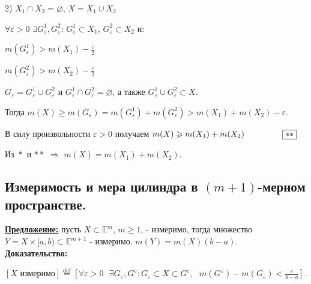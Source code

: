 \documentclass[a4paper,12pt]{article} %
\begin{document}
\vspace{5mm}
2) $X_1 \cap X_2 = \varnothing$, $X = X_1 \cup X_2$

$\forall \varepsilon > 0$ $\exists G_{\varepsilon}^1, G_{\varepsilon}^2$: $G_{\varepsilon}^1 \subset X_1$, $G_{\varepsilon}^2 \subset X_2$ и:

$m(G_{\varepsilon}^1) > m(X_1) - \frac{\varepsilon}{2}$

$m(G_{\varepsilon}^2) > m(X_2) - \frac{\varepsilon}{2}$

\vspace{2mm}

$G_{\varepsilon} = G_{\varepsilon}^1 \cup G_{\varepsilon}^2$ и $G_{\varepsilon}^1 \cap G_{\varepsilon}^2 = \varnothing$, а также $G_{\varepsilon}^1 \cup G_{\varepsilon}^2 \subset X$.

\vspace{2mm}

Тогда $m(X) \geqslant m(G_{\varepsilon}) = m(G_{\varepsilon}^1) + m(G_{\varepsilon}^2) > m(X_1) + m(X_2) - \varepsilon$.

\vspace{2mm}

В силу произвольности $\varepsilon > 0$ получаем $m(X) \geqslant m(X_1) + m(X_2) \hspace{16mm} \boxed{**}$ 

\vspace{2mm}

Из $\boxed{*}$ и $\boxed{**}$ $\Rightarrow$ $m(X) = m(X_1) + m(X_2)$.\\

\subsection{Измеримость и мера цилиндра в $(m+1)$-мерном пространстве.}

\underline{\textbf{Предложение:}} пусть $X \subset \mathbb{E}^m$, $m \geqslant 1$, - измеримо, тогда множество $Y = X\times [a, b) \subset \mathbb{E}^{m + 1}$ - измеримо. $m(Y) = m(X)(b - a)$.\\

\textbf{Доказательство:}

$\left[X \text{ измеримо}\right] \stackrel{\text{def}}{=} \left[\forall \varepsilon > 0\text{ }\exists G_{\varepsilon}, G^{\varepsilon}: G_{\varepsilon}\subset X\subset G^{\varepsilon}, \text{ } m(G^{\varepsilon}) - m(G_{\varepsilon}) < \frac{\varepsilon}{b - a}\right]$.

\vspace{2mm}
\end{document}
